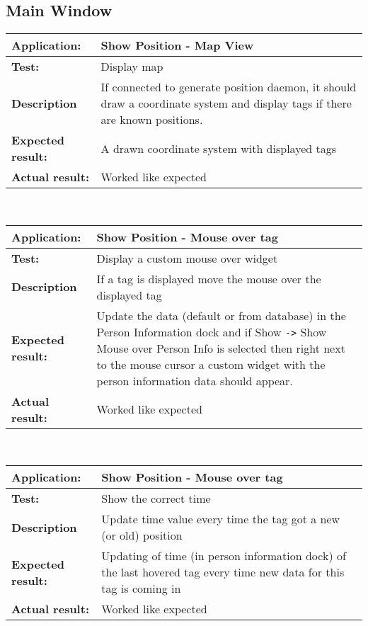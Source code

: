   \subsection{Main Window}
   \begin{tabular}{|p{3.5cm}|p{10.5cm}|}
    \hline
     \textbf{Application:}	& Show Position - Map View\\
    \hline
     \textbf{Test:}		& Display map\\
    \hline
     \textbf{Description}	& If connected to generate position daemon, it should draw a coordinate system and display tags if there are known positions.\\
    \hline
     \textbf{Expected result:}	& A drawn coordinate system with displayed tags\\
    \hline
     \textbf{Actual result:}	& Worked like expected\\
    \hline
   \end{tabular}\\
   \begin{tabular}{|p{3.5cm}|p{10.5cm}|}
    \hline
     \textbf{Application:}	& Show Position - Mouse over tag\\
    \hline
     \textbf{Test:}		& Display a custom mouse over widget\\
    \hline
     \textbf{Description}	& If a tag is displayed move the mouse over the displayed tag\\
    \hline
     \textbf{Expected result:}	& Update the data (default or from database) in the Person Information dock and if Show \verb=->= Show Mouse over Person Info is selected then right next to the mouse cursor a custom widget with the person information data should appear.\\
    \hline
     \textbf{Actual result:}	& Worked like expected\\
    \hline
   \end{tabular}\\
   \begin{tabular}{|p{3.5cm}|p{10.5cm}|}
    \hline
     \textbf{Application:}	& Show Position - Mouse over tag\\
    \hline
     \textbf{Test:}		& Show the correct time\\
    \hline
     \textbf{Description}	& Update time value every time the tag got a new (or old) position\\
    \hline
     \textbf{Expected result:}	& Updating of time (in person information dock) of the last hovered tag every time new data for this tag is coming in\\
    \hline
     \textbf{Actual result:}	& Worked like expected\\
    \hline
   \end{tabular}\\
